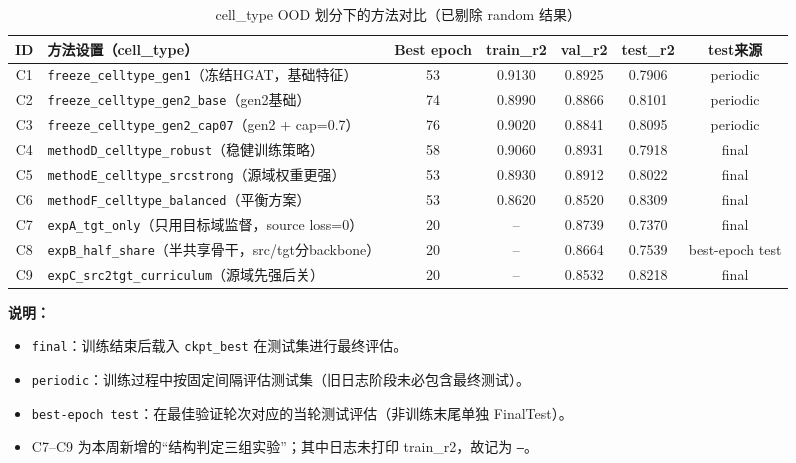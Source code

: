 \documentclass[12pt,a4paper]{ctexart}
\begin{document}
\begin{table}[htbp]
\centering
\scriptsize
\setlength{\tabcolsep}{4.5pt}
\renewcommand{\arraystretch}{1.18}
\begin{tabularx}{\textwidth}{c >{\raggedright\arraybackslash}X c c c c c}
\toprule
ID & 方法设置（cell\_type） & Best epoch & train\_r2 & val\_r2 & test\_r2 & test来源 \\
\midrule
C1 & \texttt{freeze\_celltype\_gen1}（冻结HGAT，基础特征） & 53 & 0.9130 & 0.8925 & 0.7906 & periodic \\
C2 & \texttt{freeze\_celltype\_gen2\_base}（gen2基础） & 74 & 0.8990 & 0.8866 & 0.8101 & periodic \\
C3 & \texttt{freeze\_celltype\_gen2\_cap07}（gen2 + cap=0.7） & 76 & 0.9020 & 0.8841 & 0.8095 & periodic \\
C4 & \texttt{methodD\_celltype\_robust}（稳健训练策略） & 58 & 0.9060 & 0.8931 & 0.7918 & final \\
C5 & \texttt{methodE\_celltype\_srcstrong}（源域权重更强） & 53 & 0.8930 & 0.8912 & 0.8022 & final \\
C6 & \texttt{methodF\_celltype\_balanced}（平衡方案） & 53 & 0.8620 & 0.8520 & 0.8309 & final \\
C7 & \texttt{expA\_tgt\_only}（只用目标域监督，source loss=0） & 20 & -- & 0.8739 & 0.7370 & final \\
C8 & \texttt{expB\_half\_share}（半共享骨干，src/tgt分backbone） & 20 & -- & 0.8664 & 0.7539 & best-epoch test \\
C9 & \texttt{expC\_src2tgt\_curriculum}（源域先强后关） & 20 & -- & 0.8532 & 0.8218 & final \\
\bottomrule
\end{tabularx}
\caption{cell\_type OOD 划分下的方法对比（已剔除 random 结果）}
\end{table}

\textbf{说明：}
\begin{itemize}
  \item \texttt{final}：训练结束后载入 \texttt{ckpt\_best} 在测试集进行最终评估。
  \item \texttt{periodic}：训练过程中按固定间隔评估测试集（旧日志阶段未必包含最终测试）。
  \item \texttt{best-epoch test}：在最佳验证轮次对应的当轮测试评估（非训练末尾单独 FinalTest）。
  \item C7--C9 为本周新增的“结构判定三组实验”；其中日志未打印 train\_r2，故记为 \texttt{--}。
\end{itemize}
\end{document}
